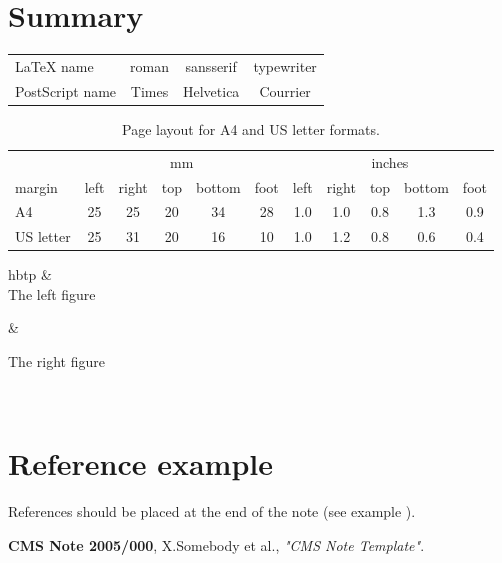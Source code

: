 \documentclass{cmspaper}
\begin{document}
\section{Summary} 


\begin{tabular}{|l|ccc|} \hline
         LaTeX name & roman & sansserif & typewriter \\
         PostScript name & Times & Helvetica & Courrier \\ \hline
      \end{tabular}

 \begin{table}[htb]
    \caption{Page layout for A4 and US letter formats.}
    \label{tab:page_layout}
    \begin{center}
      \begin{tabular}{|l|ccccc|ccccc|} \hline
               & \multicolumn{5}{c|}{mm} & \multicolumn{5}{c|}{inches} \\ 
        margin & left & right & top & bottom & foot &
                 left & right & top & bottom & foot \\ \hline
        A4 & 25 & 25 & 20 & 34 & 28 & 1.0 & 1.0 & 0.8 & 1.3 & 0.9 \\
        US letter   & 25 & 31 & 20 & 16 & 10 & 1.0 & 1.2 & 0.8 & 0.6 & 0.4 \\ \hline
      \end{tabular}
    \end{center}
  \end{table}

\begin{2figures}{hbtp}
   &
   \\
 \caption{The left figure}
  \label{fig:ex3} &
  \caption{The right figure}
  \label{fig:ex4} \\
\end{2figures}

\section{Reference example}

References should be placed at the end of the note 
(see example \cite{NOTE000}).

\begin{thebibliography}{9}
   {\bf CMS Note 2005/000},
    X.Somebody et al.,
    {\em "CMS Note Template"}.
\end{thebibliography}
\end{document}

